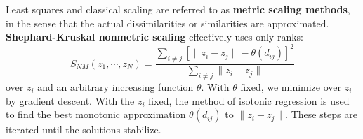 Least squares and classical scaling are referred to as \textbf{metric scaling methods}, in the sense that the actual dissimilarities or similarities are approximated. \textbf{Shephard-Kruskal nonmetric scaling} effectively uses only ranks:
\begin{equation}
S_{NM}(z_1, \cdots, z_N)  = \frac{\sum_{i\ne j} \left[ \|z_i - z_j\| - \theta(d_{ij})\right]^2}{\sum_{i\ne j}\|z_i - z_j\| }
\end{equation}
over $z_i$ and an arbitrary increasing function $\theta$. With $\theta$ fixed, we minimize over $z_i$ by gradient descent. With the $z_i$ fixed, the method of isotonic regression is used to find the best monotonic approximation $\theta(d_{ij})$ to $\|z_i - z_j \|$. These steps are iterated until the solutions stabilize.